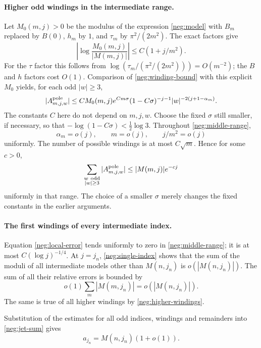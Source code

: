 \documentclass[11pt]{article}
\numberwithin{equation}{section}
\theoremstyle{definition}
\begin{document}
\paragraph{Higher odd windings in the intermediate range.}
Let \(M_0(m,j)>0\) be the modulus of the expression
\eqref{neg:model} with \(B_m\) replaced by \(B(0)\),
\(h_m\) by \(1\), and \(\tau_m\) by
\(\pi^2/(2m^2)\).  The exact factors give
\begin{equation}
 \left|\log\frac{M_0(m,j)}{|M(m,j)|}\right|
 \le C(1+j/m^2).
 \label{neg:M0}
\end{equation}
For the \(\tau\) factor this follows from
\(\log(\tau_m/(\pi^2/(2m^2)))=O(m^{-2})\);
the \(B\) and \(h\) factors cost \(O(1)\).
Comparison of \eqref{neg:winding-bound} with this
explicit \(M_0\) yields, for each odd \(|w|\ge3\),
\[
 |A^{\rm pole}_{m,j,w}|
 \le C M_0(m,j)e^{Cm\sigma}
       (1-C\sigma)^{-j-1}
       |w|^{-2(j+1-\alpha_m)} .
 \]
The constants \(C\) here do not depend on \(m,j,w\).
Choose the fixed \(\sigma\) still smaller, if necessary,
so that
\(-\log(1-C\sigma)<\tfrac12\log3\).
Throughout \eqref{neg:middle-range},
\[
 \alpha_m=o(j),\qquad m=o(j),\qquad j/m^2=o(j)
 \]
uniformly.  The number of possible windings is at most
\(C\sqrt m\).  Hence for some \(c>0\),
\begin{equation}
 \sum_{\substack{w\ {\rm odd}\\|w|\ge3}}
       |A^{\rm pole}_{m,j,w}|
 \le |M(m,j)|e^{-cj}
 \label{neg:higher-windings}
\end{equation}
uniformly in that range.  The choice of a smaller
\(\sigma\) merely changes the fixed constants in the
earlier arguments.

\paragraph{The first windings of every intermediate index.}
Equation \eqref{neg:local-error} tends uniformly to zero
in \eqref{neg:middle-range}; it is at most
\(C(\log j)^{-1/4}\).
At \(j=j_n\), \eqref{neg:single-index} shows that the sum
of the moduli of all intermediate models other than
\(M(n,j_n)\) is \(o(|M(n,j_n)|)\).
The sum of all their relative errors is bounded by
\[
 o(1)\sum_m|M(m,j_n)|=o(|M(n,j_n)|).
 \]
The same is true of all higher windings by
\eqref{neg:higher-windings}.

Substitution of the estimates for all odd indices, windings and
remainders into \eqref{neg:jet-sum} gives
\begin{equation}
 a_{j_n}=M(n,j_n)(1+o(1)).
 \label{neg:full-asymptotic}
\end{equation}
\end{document}
